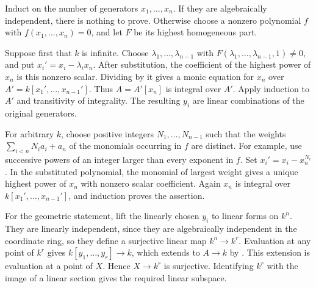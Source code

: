 Induct on the number of generators $x_1,\ldots,x_n$. If they are algebraically independent, there is nothing to prove. Otherwise choose a nonzero polynomial $f$ with $f(x_1,\ldots,x_n)=0$, and let $F$ be its highest homogeneous part.

Suppose first that $k$ is infinite. Choose $\lambda_1,\ldots,\lambda_{n-1}$ with $F(\lambda_1,\ldots,\lambda_{n-1},1)\neq0$, and put $x_i'=x_i-\lambda_i x_n$. After substitution, the coefficient of the highest power of $x_n$ is this nonzero scalar. Dividing by it gives a monic equation for $x_n$ over $A'=k[x_1',\ldots,x_{n-1}']$. Thus $A=A'[x_n]$ is integral over $A'$. Apply induction to $A'$ and transitivity of integrality. The resulting $y_i$ are linear combinations of the original generators.

For arbitrary $k$, choose positive integers $N_1,\ldots,N_{n-1}$ such that the weights $\sum_{i<n}N_i a_i+a_n$ of the monomials occurring in $f$ are distinct. For example, use successive powers of an integer larger than every exponent in $f$. Set $x_i'=x_i-x_n^{N_i}$. In the substituted polynomial, the monomial of largest weight gives a unique highest power of $x_n$ with nonzero scalar coefficient. Again $x_n$ is integral over $k[x_1',\ldots,x_{n-1}']$, and induction proves the assertion.

For the geometric statement, lift the linearly chosen $y_i$ to linear forms on $k^n$. They are linearly independent, since they are algebraically independent in the coordinate ring, so they define a surjective linear map $k^n\to k^r$. Evaluation at any point of $k^r$ gives $k[y_1,\ldots,y_r]\to k$, which extends to $A\to k$ by . This extension is evaluation at a point of $X$. Hence $X\to k^r$ is surjective. Identifying $k^r$ with the image of a linear section gives the required linear subspace.
